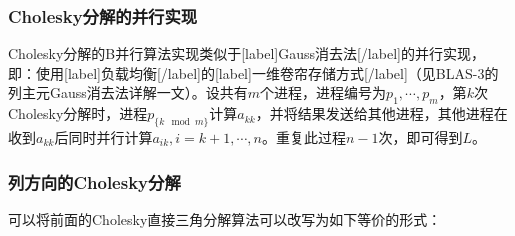 \documentclass[UTF8,nofonts]{ctexart}
\begin{document}
\let\oldnl\nl
\newcommand{\nonl}{\renewcommand{\nl}{\let\nl\oldnl}}
\begin{algorithm}[H]
\end{algorithm}

\subsubsection*{Cholesky分解的并行实现}

Cholesky分解的B并行算法实现类似于[label]Gauss消去法[/label]的并行实现，即：使用[label]负载均衡[/label]的[label]一维卷帘存储方式[/label]（见BLAS-3的列主元Gauss消去法详解一文）。设共有$m$个进程，进程编号为$p_1,\cdots,p_{m}$，第$k$次Cholesky分解时，进程$p_{\{k\mod m\}}$计算$a_{kk}$，并将结果发送给其他进程，其他进程在收到$a_{kk}$后同时并行计算$a_{ik},i=k+1,\cdots,n$。重复此过程$n-1$次，即可得到$L$。

\subsubsection*{列方向的Cholesky分解}

可以将前面的Cholesky直接三角分解算法可以改写为如下等价的形式：

\begin{algorithm}[H]
\end{algorithm}
\end{document}

